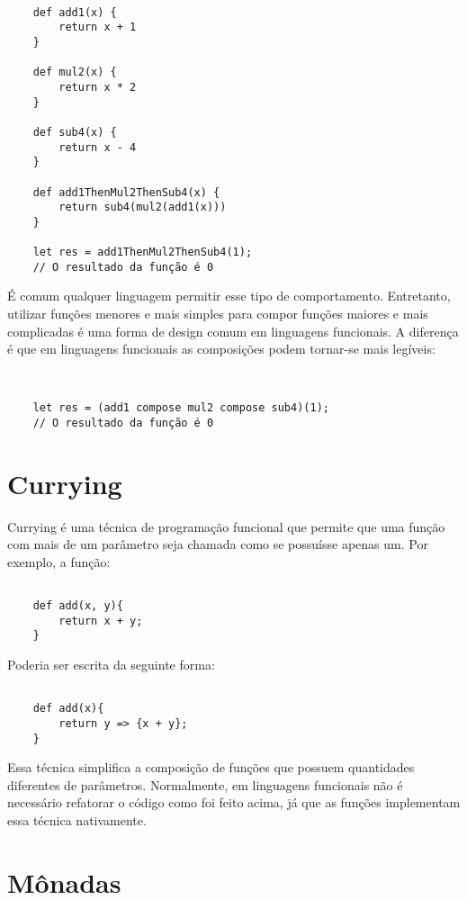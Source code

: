 \begin{lstlisting}[caption={Exemplo de Composição de Funções},label=fogex]

    def add1(x) {
        return x + 1
    }

    def mul2(x) {
        return x * 2
    }

    def sub4(x) {
        return x - 4
    }

    def add1ThenMul2ThenSub4(x) {
        return sub4(mul2(add1(x)))
    }

    let res = add1ThenMul2ThenSub4(1);
    // O resultado da função é 0

\end{lstlisting}

É comum qualquer linguagem permitir esse tipo 
de comportamento. Entretanto, 
utilizar funções menores e mais simples para compor 
funções maiores e mais complicadas é uma forma de 
design comum em linguagens funcionais. A diferença é 
que em linguagens funcionais as composições podem 
tornar-se mais legíveis:

\begin{lstlisting}[caption={Exemplo de Composição de Funções},label=fogex]


    let res = (add1 compose mul2 compose sub4)(1);
    // O resultado da função é 0

\end{lstlisting}


\section{Currying}

Currying é uma técnica de programação funcional que 
permite que uma função com mais de um parâmetro seja 
chamada como se possuísse apenas um. Por exemplo, a 
função:

\begin{lstlisting}[caption={Exemplo sem Currying},label=nocurrex]

    def add(x, y){
        return x + y;
    }

\end{lstlisting}

Poderia ser escrita da seguinte forma:

\begin{lstlisting}[caption={Exemplo de Currying},label=currex]

    def add(x){
        return y => {x + y};
    }

\end{lstlisting}

Essa técnica simplifica a composição de funções 
que possuem quantidades diferentes de parâmetros. 
Normalmente, em linguagens funcionais não é 
necessário refatorar o código como foi feito 
acima, já que as funções implementam essa técnica 
nativamente.



\section{Mônadas}

